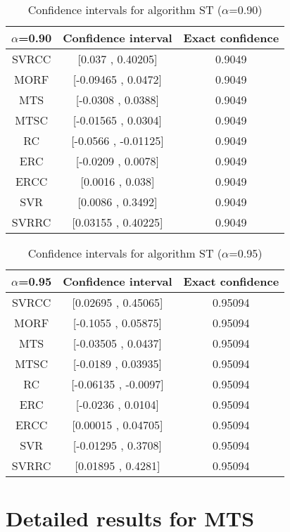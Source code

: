 \documentclass[a4paper,10pt]{article}
\begin{document}
\begin{table}[!htp]
\centering\small
\begin{tabular}{
|c|c|c|}
\hline
 $\alpha$=0.90 & Confidence interval & Exact confidence \\ \hline 
SVRCC & [0.037 , 0.40205] & 0.9049\\ \hline 
MORF & [-0.09465 , 0.0472] & 0.9049\\ \hline 
MTS & [-0.0308 , 0.0388] & 0.9049\\ \hline 
MTSC & [-0.01565 , 0.0304] & 0.9049\\ \hline 
RC & [-0.0566 , -0.01125] & 0.9049\\ \hline 
ERC & [-0.0209 , 0.0078] & 0.9049\\ \hline 
ERCC & [0.0016 , 0.038] & 0.9049\\ \hline 
SVR & [0.0086 , 0.3492] & 0.9049\\ \hline 
SVRRC & [0.03155 , 0.40225] & 0.9049\\ \hline 

\end{tabular}
\caption{Confidence intervals for algorithm ST ($\alpha$=0.90)}
\end{table}
\begin{table}[!htp]
\centering\small
\begin{tabular}{
|c|c|c|}
\hline
 $\alpha$=0.95 & Confidence interval & Exact confidence \\ \hline 
SVRCC & [0.02695 , 0.45065] & 0.95094\\ \hline 
MORF & [-0.1055 , 0.05875] & 0.95094\\ \hline 
MTS & [-0.03505 , 0.0437] & 0.95094\\ \hline 
MTSC & [-0.0189 , 0.03935] & 0.95094\\ \hline 
RC & [-0.06135 , -0.0097] & 0.95094\\ \hline 
ERC & [-0.0236 , 0.0104] & 0.95094\\ \hline 
ERCC & [0.00015 , 0.04705] & 0.95094\\ \hline 
SVR & [-0.01295 , 0.3708] & 0.95094\\ \hline 
SVRRC & [0.01895 , 0.4281] & 0.95094\\ \hline 

\end{tabular}
\caption{Confidence intervals for algorithm ST ($\alpha$=0.95)}
\end{table}

 \clearpage 


\section{Detailed results for MTS}
\end{document}
